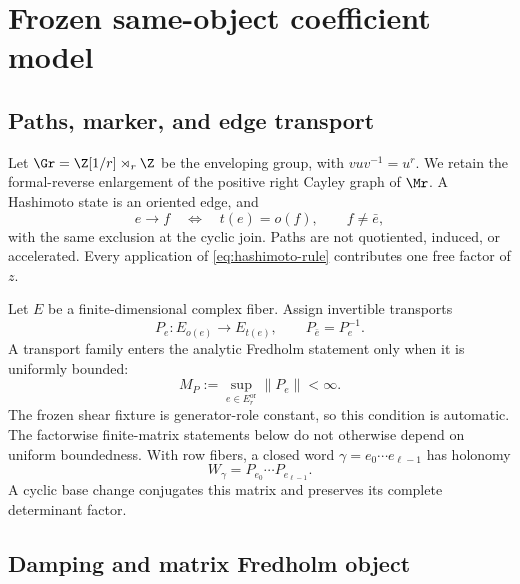\section{Frozen same-object coefficient model}
\label{sec:source}

\subsection{Paths, marker, and edge transport}

Let $\Gr=\Z[1/r]\rtimes_r\Z$ be the enveloping group, with
$vuv^{-1}=u^r$.  We retain the formal-reverse enlargement of the positive
right Cayley graph of $\Mr$.  A Hashimoto state is an oriented edge, and
\begin{equation}
  e\longrightarrow f
  \quad\Longleftrightarrow\quad
  t(e)=o(f),\qquad f\ne\bar e,
  \label{eq:hashimoto-rule}
\end{equation}
with the same exclusion at the cyclic join.  Paths are not quotiented,
induced, or accelerated.  Every application of \cref{eq:hashimoto-rule}
contributes one free factor of $z$.

Let $E$ be a finite-dimensional complex fiber.  Assign invertible transports
\begin{equation}
  P_e:E_{o(e)}\longrightarrow E_{t(e)},
  \qquad P_{\bar e}=P_e^{-1}.
  \label{eq:inverse-transport}
\end{equation}
A transport family enters the analytic Fredholm statement only when it is
uniformly bounded:
\begin{equation}
  M_P:=\sup_{e\in E_r^{\mathrm{or}}}\lVert P_e\rVert<\infty.
  \label{eq:uniform-transport}
\end{equation}
The frozen shear fixture is generator-role constant, so this condition is
automatic.  The factorwise finite-matrix statements below do not otherwise
depend on uniform boundedness.
With row fibers, a closed word $\gamma=e_0\cdots e_{\ell-1}$ has holonomy
\begin{equation}
  W_\gamma=P_{e_0}\cdots P_{e_{\ell-1}}.
  \label{eq:holonomy}
\end{equation}
A cyclic base change conjugates this matrix and preserves its complete
determinant factor.

\subsection{Damping and matrix Fredholm object}

